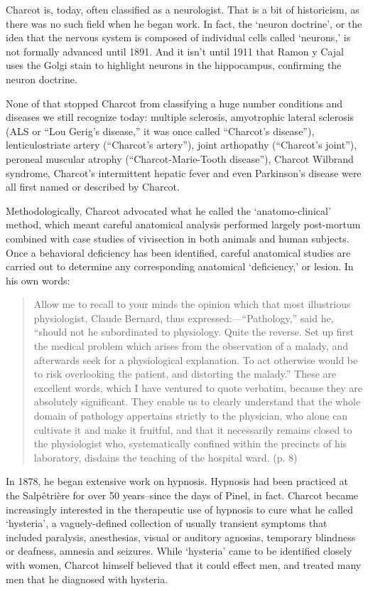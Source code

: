 Charcot is, today, often classified as a neurologist. That is a bit of historicism, as there was no such field when he began work. In fact, the `neuron doctrine', or the idea that the nervous system is composed of individual cells called `neurons,' is not formally advanced until 1891. And it isn't until 1911 that Ramon y Cajal uses the Golgi stain to highlight neurons in the hippocampus, confirming the neuron doctrine.

None of that stopped Charcot from classifying a huge number conditions and diseases we still recognize today: multiple sclerosis, amyotrophic lateral sclerosis (ALS or ``Lou Gerig's disease,'' it was once called ``Charcot's disease''), lenticulostriate artery (``Charcot's artery''), joint arthopathy (``Charcot's joint''), peroneal muscular atrophy (``Charcot-Marie-Tooth disease''), Charcot Wilbrand syndrome, Charcot's intermittent hepatic fever and even Parkinson's disease were all first named or described by Charcot.

Methodologically, Charcot advocated what he called the `anatomo-clinical' method, which meant careful anatomical analysis performed largely post-mortum combined with case studies of vivisection in both animals and human subjects. Once a behavioral deficiency has been identified, careful anatomical studies are carried out to determine any corresponding anatomical `deficiency,' or lesion. In his own words:

\begin{quote}

Allow me to recall to your minds the opinion which that most illustrious physiologist, Claude Bernard, thus expressed:---``Pathology,'' said he, ``should not he subordinated to physiology. Quite the reverse. Set up first the medical problem which arises from the observation of a malady, and afterwards seek for a physiological explanation. To act otherwise would be to risk overlooking the patient, and distorting the malady.'' These are excellent words, which I have ventured to quote verbatim, because they are absolutely significant. They enable us to clearly understand that the whole domain of pathology appertains strictly to the physician, who alone can cultivate it and make it fruitful, and that it necessarily remains closed to the physiologist who, systematically confined within the precincts of his laboratory, disdains the teaching of the hospital ward. (p. 8)
\end{quote}

In 1878, he began extensive work on hypnosis. Hypnosis had been practiced at the Salpêtrière for over 50 years--since the days of Pinel, in fact. Charcot became increasingly interested in the therapeutic use of hypnosis to cure what he called `hysteria', a vaguely-defined collection of usually transient symptoms that included paralysis, anesthesias, visual or auditory agnosias, temporary blindness or deafness, amnesia and seizures. While `hysteria' came to be identified closely with women, Charcot himself believed that it could effect men, and treated many men that he diagnosed with hysteria.

